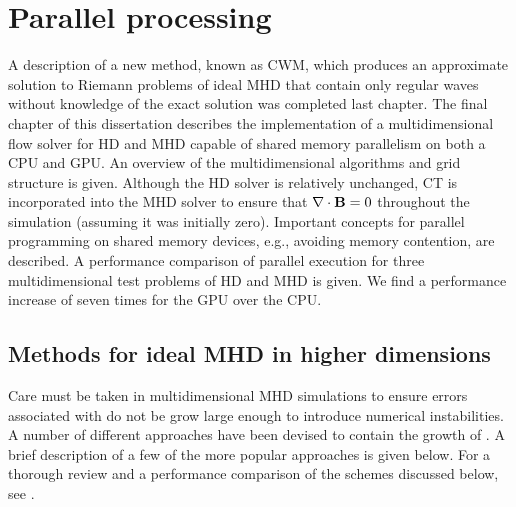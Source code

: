 %
%


\chapter[Parallel processing]{Parallel processing}
\label{chp:gpu}

A description of a new method, known as CWM, which produces an approximate solution to Riemann problems of ideal MHD that contain only regular waves without knowledge of the exact solution  was completed last chapter.  The final chapter of this dissertation describes the implementation of a multidimensional flow solver for HD and MHD capable of shared memory parallelism on both a CPU and GPU.  An overview of the multidimensional algorithms and grid structure is given.  Although the HD solver is relatively unchanged, CT \citep{Evans:1988} is incorporated into the MHD solver to ensure that $\mathbf{\nabla} \cdot \mathbf{B} = 0$ throughout the simulation (assuming it was initially zero).  Important concepts for parallel programming on shared memory devices, e.g., avoiding memory contention, are described.  A performance comparison of parallel execution for three multidimensional test problems of HD and MHD is given.  We find a performance increase of  seven times for the GPU over the CPU.  

\section[Methods for ideal MHD in higher dimensions]{Methods for ideal MHD in higher dimensions}          
\label{sec:2d_mhd}

Care must be taken in multidimensional MHD simulations to ensure errors associated with  do not be grow large enough to introduce numerical instabilities.  A number of different approaches have been devised to contain the growth of .  A brief description of a few of the more popular approaches is given below.  For a thorough review and a performance comparison of the schemes discussed below, see \citep{Toth:2000}.  

